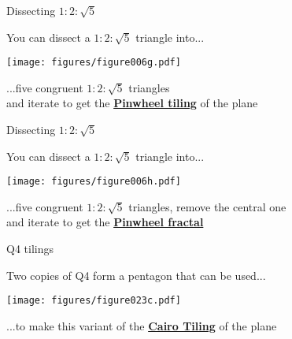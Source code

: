 \documentclass[14pt]{beamer}
\begin{document}

    \begin{frame}{Dissecting $1\!\!:\!\!2\!\!:\!\!\sqrt{5}$}
        \begin{center}
            You can dissect a $1\!\!:\!\!2\!\!:\!\!\sqrt{5}$ triangle into...

            \bigskip \bigskip

            \texttt{[image: figures/figure006g.pdf]}

            \bigskip \bigskip

            ...five congruent $1\!\!:\!\!2\!\!:\!\!\sqrt{5}$ triangles\\and iterate to get the \textbf{\href{https://en.wikipedia.org/wiki/Pinwheel_tiling}{Pinwheel tiling}} of the plane
        \end{center}
    \end{frame}


    \begin{frame}{Dissecting $1\!\!:\!\!2\!\!:\!\!\sqrt{5}$}
        \begin{center}
            You can dissect a $1\!\!:\!\!2\!\!:\!\!\sqrt{5}$ triangle into...

            \bigskip \bigskip

            \texttt{[image: figures/figure006h.pdf]}

            \bigskip \bigskip

            ...five congruent $1\!\!:\!\!2\!\!:\!\!\sqrt{5}$ triangles, remove the central one\\and iterate to get the \textbf{\href{https://en.wikipedia.org/wiki/Pinwheel_tiling}{Pinwheel fractal}}
        \end{center}
    \end{frame}


    \begin{frame}{Q4 tilings}
        \begin{center}
            Two copies of Q4 form a pentagon that can be used...

            \bigskip \bigskip

            \texttt{[image: figures/figure023c.pdf]}

            \bigskip \bigskip

            ...to make this variant of the \textbf{\href{https://en.wikipedia.org/wiki/Cairo_pentagonal_tiling}{Cairo Tiling}} of the plane
        \end{center}
    \end{frame}
\end{document}
